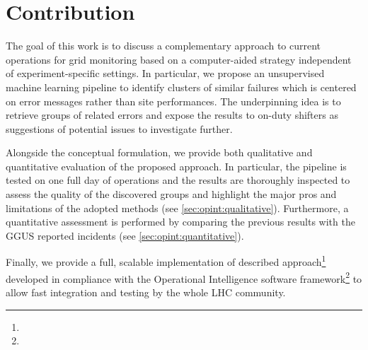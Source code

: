 \section{Contribution}
The goal of this work is to discuss a complementary approach to current operations for grid monitoring based on a computer-aided strategy independent of experiment-specific settings.
In particular, we propose an unsupervised machine learning pipeline to identify clusters of similar failures which is centered on error messages rather than site performances. 
The underpinning idea is to retrieve groups of related errors and expose the results to on-duty shifters as suggestions of potential issues to investigate further.

Alongside the conceptual formulation, we provide both qualitative and quantitative evaluation of the proposed approach.
In particular, the pipeline is tested on one full day of operations and the results are thoroughly inspected to assess the quality of the discovered groups and highlight the major pros and limitations of the adopted methods (see \cref{sec:opint:qualitative}).
Furthermore, a quantitative assessment is performed by comparing the previous results with the GGUS reported incidents (see \cref{sec:opint:quantitative}).

Finally, we provide a full, scalable implementation of described approach\footnote{\githubpyspark} developed in compliance with the Operational Intelligence software framework\footnote{\githubopint} to allow fast integration and testing by the whole LHC community.
